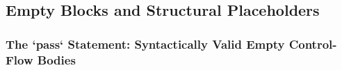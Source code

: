 \subsection{Empty Blocks and Structural Placeholders}
\subsubsection{The `pass` Statement: Syntactically Valid Empty Control-Flow Bodies}
